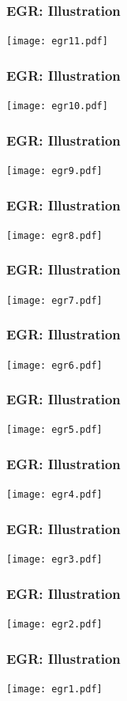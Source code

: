 \documentclass{beamer}
\begin{document}
		\begin{frame}
			\frametitle{EGR: Illustration}
			\begin{center}
					\texttt{[image: egr11.pdf]}
			\end{center}
	    \end{frame}
		\begin{frame}
			\frametitle{EGR: Illustration}
			\begin{center}
					\texttt{[image: egr10.pdf]}
			\end{center}
	    \end{frame}
		\begin{frame}
			\frametitle{EGR: Illustration}
			\begin{center}
					\texttt{[image: egr9.pdf]}
			\end{center}
	    \end{frame}
		\begin{frame}
			\frametitle{EGR: Illustration}
			\begin{center}
					\texttt{[image: egr8.pdf]}
			\end{center}
	    \end{frame}
		\begin{frame}
			\frametitle{EGR: Illustration}
			\begin{center}
					\texttt{[image: egr7.pdf]}
			\end{center}
	    \end{frame}
		\begin{frame}
			\frametitle{EGR: Illustration}
			\begin{center}
					\texttt{[image: egr6.pdf]}
			\end{center}
	    \end{frame}
		\begin{frame}
			\frametitle{EGR: Illustration}
			\begin{center}
					\texttt{[image: egr5.pdf]}
			\end{center}
	    \end{frame}
		\begin{frame}
			\frametitle{EGR: Illustration}
			\begin{center}
					\texttt{[image: egr4.pdf]}
			\end{center}
	    \end{frame}
		\begin{frame}
			\frametitle{EGR: Illustration}
			\begin{center}
					\texttt{[image: egr3.pdf]}
			\end{center}
	    \end{frame}
		\begin{frame}
			\frametitle{EGR: Illustration}
			\begin{center}
					\texttt{[image: egr2.pdf]}
			\end{center}
	    \end{frame}
		\begin{frame}
			\frametitle{EGR: Illustration}
			\begin{center}
					\texttt{[image: egr1.pdf]}
			\end{center}
	    \end{frame}
\end{document}

